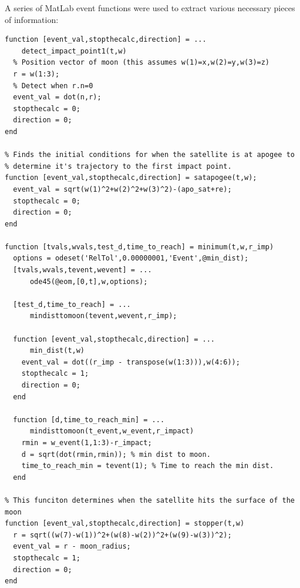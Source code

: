 \documentclass{article}
\begin{document}
A series of MatLab event functions were used to extract various
necessary pieces of information:
\begin{verbatim}
function [event_val,stopthecalc,direction] = ...
    detect_impact_point1(t,w)
  % Position vector of moon (this assumes w(1)=x,w(2)=y,w(3)=z)
  r = w(1:3);
  % Detect when r.n=0
  event_val = dot(n,r);
  stopthecalc = 0;
  direction = 0;
end

% Finds the initial conditions for when the satellite is at apogee to
% determine it's trajectory to the first impact point.
function [event_val,stopthecalc,direction] = satapogee(t,w);
  event_val = sqrt(w(1)^2+w(2)^2+w(3)^2)-(apo_sat+re);
  stopthecalc = 0;
  direction = 0;
end

function [tvals,wvals,test_d,time_to_reach] = minimum(t,w,r_imp)
  options = odeset('RelTol',0.00000001,'Event',@min_dist);
  [tvals,wvals,tevent,wevent] = ...
      ode45(@eom,[0,t],w,options);
 
  [test_d,time_to_reach] = ...
      mindisttomoon(tevent,wevent,r_imp);

  function [event_val,stopthecalc,direction] = ...
      min_dist(t,w)
    event_val = dot((r_imp - transpose(w(1:3))),w(4:6));
    stopthecalc = 1;
    direction = 0;
  end

  function [d,time_to_reach_min] = ...
      mindisttomoon(t_event,w_event,r_impact)
    rmin = w_event(1,1:3)-r_impact;
    d = sqrt(dot(rmin,rmin)); % min dist to moon.
    time_to_reach_min = tevent(1); % Time to reach the min dist.
  end

% This funciton determines when the satellite hits the surface of the moon
function [event_val,stopthecalc,direction] = stopper(t,w)
  r = sqrt((w(7)-w(1))^2+(w(8)-w(2))^2+(w(9)-w(3))^2);
  event_val = r - moon_radius;
  stopthecalc = 1;
  direction = 0;
end
\end{verbatim}
\end{document}
